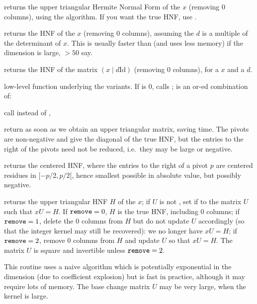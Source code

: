  returns the upper triangular Hermite Normal Form of the
 $x$ (removing $0$ columns), using the  algorithm. If you
want the true HNF, use .

 returns the HNF of the  $x$
(removing $0$ columns), assuming the  $d$ is a multiple of the
determinant of $x$. This is usually faster than  (and uses less
memory) if the dimension is large, $> 50$ say.

 returns the HNF of the matrix $(x \mid d
\text{Id})$ (removing $0$ columns), for a  $x$ and a  $d$.

 low-level function underlying the
 variants. If  is $0$, calls ;
 is an or-ed combination of:

\item {} call  instead of ,

\item {} return as soon as we obtain an upper triangular matrix,
saving time. The pivots are non-negative and give the diagonal of the true HNF,
but the entries to the right of the pivots need not be reduced, i.e.~they may be
large or negative.

\item {} returns the centered HNF, where the entries to the right of
a pivot $p$ are centered residues in $[-p/2, p/2[$, hence smallest possible in
absolute value, but possibly negative.

 returns the upper triangular HNF
$H$ of the  $x$; if $U$ is not , set if to the matrix $U$ such
that $x U = H$. If ${\tt remove} = 0$, $H$ is the true HNF, including $0$ columns;
if ${\tt remove} = 1$, delete the $0$ columns from $H$ but do not update $U$
accordingly (so that the integer kernel may still be recovered): we no longer have
$x U = H$; if ${\tt remove} = 2$, remove $0$ columns from $H$ and update $U$ so
that $x U = H$. The matrix $U$ is square and invertible unless ${\tt remove} = 2$.

This routine uses a naive algorithm which is potentially exponential in the
dimension (due to coefficient explosion) but is fast in practice, although it
may require lots of memory. The base change matrix $U$ may be very large,
when the kernel is large.

